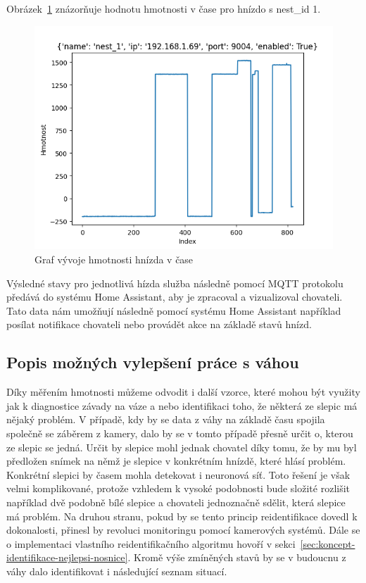 Obrázek~\ref{fig:weight_egg_chart_timeline} znázorňuje hodnotu hmotnosti v čase pro hnízdo s nest\_id 1.

\begin{figure}[h]
    \centering
    \includegraphics[width=\textwidth]{img/weight_egg_chart_timeline}
    \caption{Graf vývoje hmotnosti hnízda v čase}
    \label{fig:weight_egg_chart_timeline}
\end{figure}

Výsledné stavy pro jednotlivá hízda služba následně pomocí MQTT protokolu předává do systému Home Assistant, aby je zpracoval a vizualizoval chovateli.
Tato data nám umožňují následně pomocí systému Home Assistant například posílat notifikace chovateli nebo provádět akce na základě stavů hnízd.
\newline


\subsection*{Popis možných vylepšení práce s váhou}
Díky měřením hmotnosti můžeme odvodit i další vzorce, které mohou být využity jak k diagnostice závady na váze a nebo identifikaci toho, že některá ze slepic má nějaký problém.
V případě, kdy by se data z váhy na základě času spojila společně se záběrem z kamery, dalo by se v tomto případě přesně určit o, kterou ze slepic se jedná. \newline
Určit by slepice mohl jednak chovatel díky tomu, že by mu byl předložen snímek na němž je slepice v konkrétním hnízdě, které hlásí problém.
Konkrétní slepici by časem mohla detekovat i neuronová síť. \newline
Toto řešení je však velmi komplikované, protože vzhledem k vysoké podobnosti bude složité rozlišit například dvě podobně bílé slepice a chovateli jednoznačně sdělit, která slepice má problém.
Na druhou stranu, pokud by se tento princip reidentifikace dovedl k dokonalosti, přinesl by revoluci monitoringu pomocí kamerových systémů.
Dále se o implementaci vlastního reidentifikačního algoritmu hovoří v sekci~\ref{sec:koncept-identifikace-nejlepsi-nosnice}.
\newline
Kromě výše zmíněných stavů by se v budoucnu z váhy dalo identifikovat i následující seznam situací.

